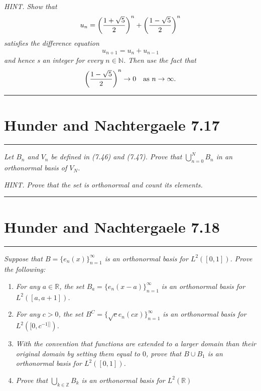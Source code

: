 \documentclass{article} %
\theoremstyle{plain}
\def\Rl{\mathbb{R}}
\newcommand{\problem}[1]{
\begin{minipage}{\textwidth}
    \begin{center}
        \noindent\rule{5cm}{1pt}
    \end{center}
    \section{\bf #1}
    \begin{center}
        \noindent\rule{5cm}{1pt}
    \end{center}
    \vspace{0.25cm}
\end{minipage}
}
\numberwithin{equation}{section} %
\numberwithin{figure}{section} %
\numberwithin{table}{section} %
\begin{document}
\emph{HINT.  Show that $$u_n = \qty(\frac{1 + \sqrt{5}}{2})^n + \qty(\frac{1 - \sqrt{5}}{2})^n$$ satisfies the difference equation $$u_{n+1} = u_n + u_{n-1}$$ and hence s an integer for every $n \in \mathbb{N}$.  Then use the fact that $$\qty(\frac{1 - \sqrt{5}}{2})^n \rightarrow 0\ \ \text{ as } n \rightarrow \infty.$$}

\problem{Hunder and Nachtergaele 7.17}
\emph{Let $B_n$ and $V_n$ be defined in (7.46) and (7.47).  Prove that $\bigcup_{n=0}^N B_n$ in an orthonormal basis of $V_N$.}

\emph{HINT.  Prove that the set is orthonormal and count its elements.}

\problem{Hunder and Nachtergaele 7.18}
\emph{Suppose that $B = \{e_n(x)\}_{n=1}^\infty$ is an orthonormal basis for $L^2([0,1])$.  Prove the following:}
\begin{enumerate}[ (a)]
    \item
        \emph{For any $a \in \Rl$, the set $B_a = \{e_n(x - a)\}_{n=1}^\infty$ is an orthonormal basis for $L^2([a, a+1])$.}
    \item
        \emph{For any $c > 0$, the set $B^C = \{\sqrt{c}e_n(cx)\}_{n=1}^\infty$ is an orthonormal basis for $L^2([0, c^{-1]]})$.}
    \item
        \emph{With the convention that functions are extended to a larger domain than their original domain by setting them equal to $0$, prove that $B \cup B_1$ is an orthonormal basis for $L^2([0,1])$.}
    \item
        \emph{Prove that $\bigcup_{k\in\mathbb{Z}} B_k$ is an orthonormal basis for $L^2(\Rl)$}
\end{enumerate}
\end{document}

